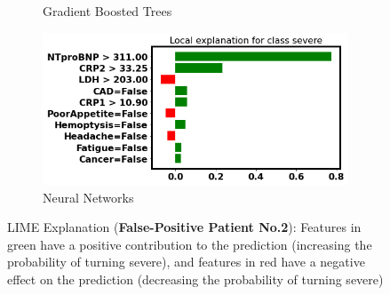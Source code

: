 \begin{figure}
\begin{subfigure}[b]{0.45\textwidth}
    \caption{Gradient Boosted Trees}
    \label{fig:lime_xgb_2}
\end{subfigure}
\hfill
\begin{subfigure}[b]{0.45\textwidth}
    \centering
    \includegraphics[width=\textwidth]{figures/chapter_interp/lime_nn_2.png}
    \caption{Neural Networks}
    \label{fig:lime_nn_2}
\end{subfigure}
\hfill
\caption{LIME Explanation (\textbf{False-Positive Patient No.2}): Features in green have a positive contribution to the prediction (increasing the probability of turning severe), and features in red have a negative effect on the prediction (decreasing the probability of turning severe)}
\label{fig:lime_2}
\end{figure}

